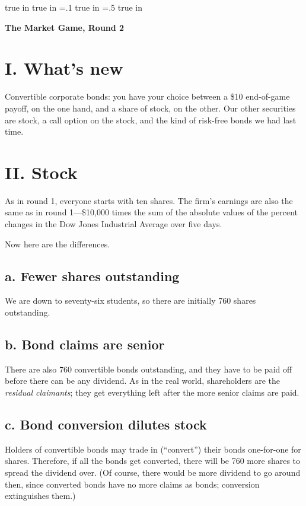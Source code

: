 
\parskip=4pt
\parindent=0pt
 true in
 true in\relax
\hoffset=.1 true in
\voffset=.5 true in

\footline{\hfil\folio\hfil}

\centerline{{\bf The Market Game, Round 2}}

\section{I. What's new}%
Convertible corporate bonds: you have your choice between a \$10
end-of-game payoff, on the one hand, and a share of stock, on the
other.  Our other securities are stock, a call option on the stock,
and the kind of risk-free bonds we had last time.

\section{II. Stock}%
As in round 1, everyone starts with ten shares.  The firm's earnings
are also the same as in round 1---\$10,000 times the sum of the
absolute values of the percent changes in the Dow Jones Industrial
Average over five days.

Now here are the differences.

\subsection{a. Fewer shares outstanding} 
We are down to seventy-six
students, so there are initially 760 shares outstanding.

\subsection{b. Bond claims are senior}
There are also 760 convertible bonds outstanding, and they have to be
paid off before there can be any dividend.  As in the real world,
shareholders are the {\it residual claimants}; they get everything
left after the more senior claims are paid.

\subsection{c. Bond conversion dilutes stock}
Holders of convertible bonds may trade in (``convert'') their bonds
one-for-one for shares.  Therefore, if all the bonds get converted,
there will be 760 more shares to spread the dividend over.  (Of
course, there would be more dividend to go around then, since
converted bonds have no more claims as bonds; conversion extinguishes
them.)

